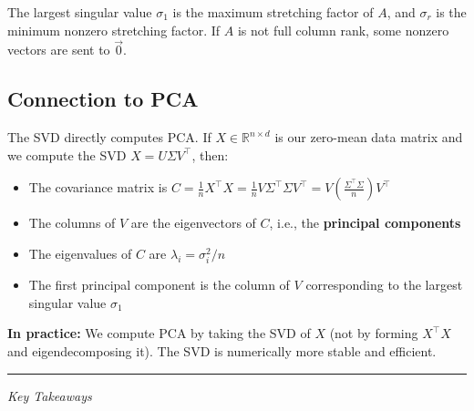 \documentclass[10pt, twocolumn]{article}
\theoremstyle{definition}
\theoremstyle{plain}
\newcommand{\RR}{\mathbb{R}}
\begin{document}
The largest singular value $\sigma_1$ is the maximum stretching factor of $A$, and $\sigma_r$ is the minimum nonzero stretching factor. If $A$ is not full column rank, some nonzero vectors are sent to $\vec{0}$.

\subsection{Connection to PCA}

The SVD directly computes PCA. If $X \in \RR^{n \times d}$ is our zero-mean data matrix and we compute the SVD $X = U\Sigma V^\top$, then:

\begin{itemize}
    \item The covariance matrix is $C = \frac{1}{n}X^\top X = \frac{1}{n}V\Sigma^\top \Sigma V^\top = V \left(\frac{\Sigma^\top \Sigma}{n}\right) V^\top$
    \item The columns of $V$ are the eigenvectors of $C$, i.e., the \textbf{principal components}
    \item The eigenvalues of $C$ are $\lambda_i = \sigma_i^2 / n$
    \item The first principal component is the column of $V$ corresponding to the largest singular value $\sigma_1$
\end{itemize}

\begin{tcolorbox}[colframe=black!50]
\textbf{In practice:} We compute PCA by taking the SVD of $X$ (not by forming $X^\top X$ and eigendecomposing it). The SVD is numerically more stable and efficient.
\end{tcolorbox}


\vfill

\begin{center}
\rule{0.5\linewidth}{0.4pt}

\textit{Key Takeaways}
\end{center}
\end{document}

